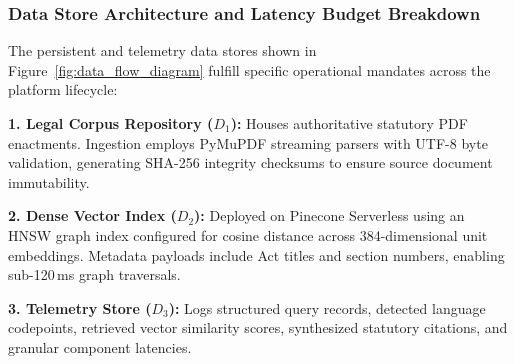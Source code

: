 \documentclass[12pt,a4paper]{report}
\begin{document}
\vspace{-8pt}
\begin{table}[htbp]
\centering
\small
{}
\caption{Level-1 Data Flow Diagram (DFD) Process and Data Store Interaction Matrix.}
\label{tab:dfd_process_matrix}
\end{table}
\vspace{-8pt}

\subsubsection{Data Store Architecture and Latency Budget Breakdown}
The persistent and telemetry data stores shown in Figure~\ref{fig:data_flow_diagram} fulfill specific operational mandates across the platform lifecycle:

\noindent\textbf{1. Legal Corpus Repository ($D_1$):} Houses authoritative statutory PDF enactments. Ingestion employs PyMuPDF streaming parsers with UTF-8 byte validation, generating SHA-256 integrity checksums to ensure source document immutability.\par\vspace{2pt}
\noindent\textbf{2. Dense Vector Index ($D_2$):} Deployed on Pinecone Serverless using an HNSW graph index configured for cosine distance across 384-dimensional unit embeddings. Metadata payloads include Act titles and section numbers, enabling sub-120\,ms graph traversals.\par\vspace{2pt}
\noindent\textbf{3. Telemetry Store ($D_3$):} Logs structured query records, detected language codepoints, retrieved vector similarity scores, synthesized statutory citations, and granular component latencies.\par\vspace{2pt}
\end{document}
